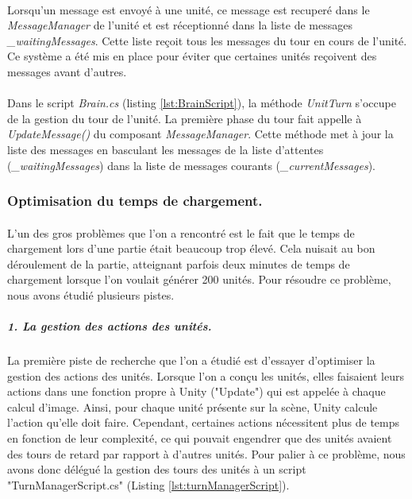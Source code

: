 \documentclass{report}
\begin{document}
\paragraph{}
Lorsqu'un message est envoyé à une unité, ce message est recuperé dans le \textit{MessageManager} de l'unité et est réceptionné dans la liste de messages \textit{\_waitingMessages}. Cette liste reçoit tous les messages du tour en cours de l'unité. Ce système a été mis en place pour éviter que certaines unités reçoivent des messages avant d'autres.
\paragraph{}
Dans le script \textit{Brain.cs} (listing \ref{lst:BrainScript}), la méthode \textit{UnitTurn} s'occupe de la gestion du tour de l'unité. La première phase du tour fait appelle à \textit{UpdateMessage()} du composant \textit{MessageManager}. Cette méthode met à jour la liste des messages en basculant les messages de la liste d'attentes (\textit{\_waitingMessages}) dans la liste de messages courants (\textit{\_currentMessages}).

\subsubsection{Optimisation du temps de chargement.}
\paragraph{} L'un des gros problèmes que l'on a rencontré est le fait que le temps de chargement lors d'une partie était beaucoup trop élevé. Cela nuisait au bon déroulement de la partie, atteignant parfois deux minutes de temps de chargement lorsque l'on voulait générer 200 unités. Pour résoudre ce problème, nous avons étudié plusieurs pistes.
\subparagraph{1. La gestion des actions des unités.}La première piste de recherche que l'on a étudié est d'essayer d'optimiser la gestion des actions des unités. Lorsque l'on a conçu les unités, elles faisaient leurs actions dans une fonction propre à Unity ("Update") qui est appelée à chaque calcul d'image. Ainsi, pour chaque unité présente sur la scène, Unity calcule l'action qu'elle doit faire. Cependant, certaines actions nécessitent plus de temps en fonction de leur complexité, ce qui pouvait engendrer que des unités avaient des tours de retard par rapport à d'autres unités. \newline
Pour palier à ce problème, nous avons donc délégué la gestion des tours des unités à un script  "TurnManagerScript.cs" (Listing \ref{lst:turnManagerScript}).\newline
\end{document}
